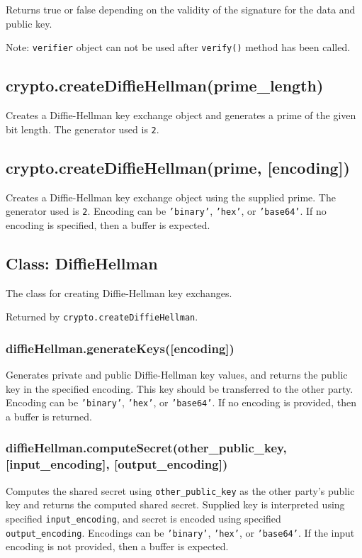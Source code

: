 Returns true or false depending on the validity of the signature for the
data and public key.

Note: \texttt{verifier} object can not be used after \texttt{verify()}
method has been called.

\subsection{crypto.createDiffieHellman(prime\_length)}

Creates a Diffie-Hellman key exchange object and generates a prime of
the given bit length. The generator used is \texttt{2}.

\subsection{crypto.createDiffieHellman(prime, {[}encoding{]})}

Creates a Diffie-Hellman key exchange object using the supplied prime.
The generator used is \texttt{2}. Encoding can be \texttt{'binary'},
\texttt{'hex'}, or \texttt{'base64'}. If no encoding is specified, then
a buffer is expected.

\subsection{Class: DiffieHellman}

The class for creating Diffie-Hellman key exchanges.

Returned by \texttt{crypto.createDiffieHellman}.

\subsubsection{diffieHellman.generateKeys({[}encoding{]})}

Generates private and public Diffie-Hellman key values, and returns the
public key in the specified encoding. This key should be transferred to
the other party. Encoding can be \texttt{'binary'}, \texttt{'hex'}, or
\texttt{'base64'}. If no encoding is provided, then a buffer is
returned.

\subsubsection{diffieHellman.computeSecret(other\_public\_key,
{[}input\_encoding{]}, {[}output\_encoding{]})}

Computes the shared secret using \texttt{other\_public\_key} as the
other party's public key and returns the computed shared secret.
Supplied key is interpreted using specified \texttt{input\_encoding},
and secret is encoded using specified \texttt{output\_encoding}.
Encodings can be \texttt{'binary'}, \texttt{'hex'}, or
\texttt{'base64'}. If the input encoding is not provided, then a buffer
is expected.

